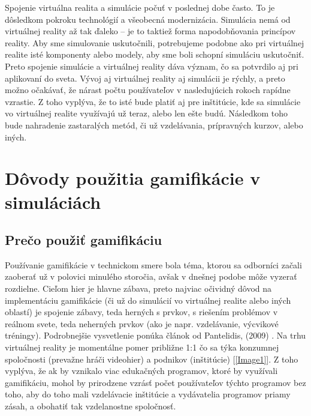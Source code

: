 \documentclass[10pt,slovak,a4paper]{article}
\begin{document}
Spojenie virtuálna realita a simulácie počuť v poslednej dobe často. To je dôsledkom pokroku technológií a všeobecná modernizácia. Simulácia nemá od virtuálnej reality až tak ďaleko – je to taktiež forma napodobňovania princípov reality. Aby sme simulovanie uskutočnili, potrebujeme podobne ako pri virtuálnej realite isté komponenty alebo modely, aby sme boli schopní simuláciu uskutočniť. Preto spojenie simulácie a virtuálnej reality dáva význam, čo sa potvrdilo aj pri aplikovaní do sveta. Vývoj aj virtuálnej reality aj simulácii je rýchly, a preto možno očakávať, že nárast počtu používateľov v nasledujúcich rokoch rapídne vzrastie. Z toho vyplýva, že to isté bude platiť aj pre inštitúcie, kde sa simulácie vo virtuálnej realite využívajú už teraz, alebo len ešte budú. Následkom toho bude nahradenie zastaralých metód, či už vzdelávania, prípravných kurzov, alebo iných. 


\section{Dôvody použitia gamifikácie v simuláciách} \label{Dovody}

\subsection{Prečo použiť gamifikáciu} \label{Preco.pouzit.gamifikaciu}

Používanie gamifikácie v technickom smere bola téma, ktorou sa odborníci začali zaoberať už v polovici minulého storočia, avšak v dnešnej podobe môže vyzerať rozdielne. Cieľom hier je hlavne zábava, preto najviac očividný dôvod na implementáciu gamifikácie (či už do simulácií vo virtuálnej realite alebo iných oblastí) je spojenie zábavy, teda herných s prvkov, s riešením problémov v reálnom svete, teda neherných prvkov (ako je napr. vzdelávanie, výcvikové tréningy). Podrobnejšie vysvetlenie ponúka článok od Pantelidis, (2009) \cite{Pantelidis}. Na trhu virtuálnej reality je momentálne pomer približne 1:1 čo sa týka konzumnej spoločnosti (prevažne hráči videohier) a podnikov (inštitúcie) [\ref{Image1}]. Z toho vyplýva, že ak by vznikalo viac edukačných programov, ktoré by využívali gamifikáciu, mohol by prirodzene vzrásť počet používateľov týchto programov bez toho, aby do toho mali vzdelávacie inštitúcie a vydávatelia programov priamy zásah, a obohatiť tak vzdelanostne spoločnosť.
\end{document}
